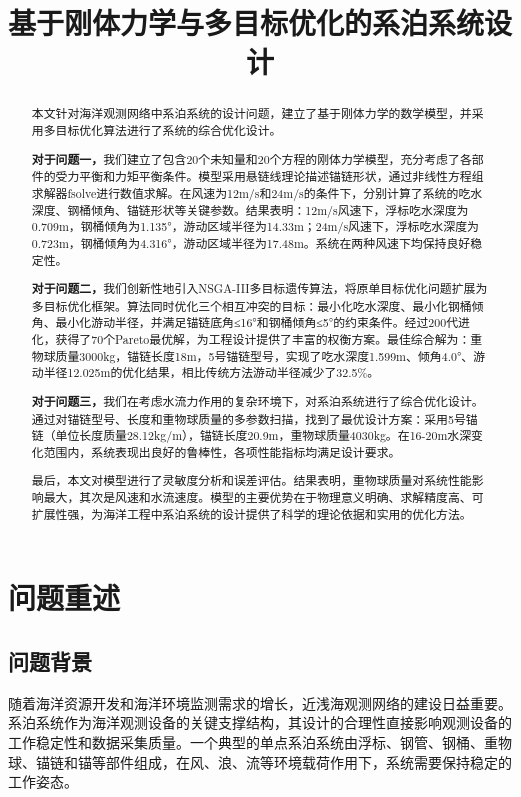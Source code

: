 \documentclass[withoutpreface,bwprint]{cumcmthesis}
\title{基于刚体力学与多目标优化的系泊系统设计}  %
\begin{document}
\maketitle
\begin{abstract}
本文针对海洋观测网络中系泊系统的设计问题，建立了基于刚体力学的数学模型，并采用多目标优化算法进行了系统的综合优化设计。

\textbf{对于问题一，}我们建立了包含20个未知量和20个方程的刚体力学模型，充分考虑了各部件的受力平衡和力矩平衡条件。模型采用悬链线理论描述锚链形状，通过非线性方程组求解器fsolve进行数值求解。在风速为12m/s和24m/s的条件下，分别计算了系统的吃水深度、钢桶倾角、锚链形状等关键参数。结果表明：12m/s风速下，浮标吃水深度为0.709m，钢桶倾角为1.135°，游动区域半径为14.33m；24m/s风速下，浮标吃水深度为0.723m，钢桶倾角为4.316°，游动区域半径为17.48m。系统在两种风速下均保持良好稳定性。

\textbf{对于问题二，}我们创新性地引入NSGA-III多目标遗传算法，将原单目标优化问题扩展为多目标优化框架。算法同时优化三个相互冲突的目标：最小化吃水深度、最小化钢桶倾角、最小化游动半径，并满足锚链底角≤16°和钢桶倾角≤5°的约束条件。经过200代进化，获得了70个Pareto最优解，为工程设计提供了丰富的权衡方案。最佳综合解为：重物球质量3000kg，锚链长度18m，5号锚链型号，实现了吃水深度1.599m、倾角4.0°、游动半径12.025m的优化结果，相比传统方法游动半径减少了32.5\%。

\textbf{对于问题三，}我们在考虑水流力作用的复杂环境下，对系泊系统进行了综合优化设计。通过对锚链型号、长度和重物球质量的多参数扫描，找到了最优设计方案：采用5号锚链（单位长度质量28.12kg/m），锚链长度20.9m，重物球质量4030kg。在16-20m水深变化范围内，系统表现出良好的鲁棒性，各项性能指标均满足设计要求。

最后，本文对模型进行了灵敏度分析和误差评估。结果表明，重物球质量对系统性能影响最大，其次是风速和水流速度。模型的主要优势在于物理意义明确、求解精度高、可扩展性强，为海洋工程中系泊系统的设计提供了科学的理论依据和实用的优化方法。

\end{abstract}


\section{问题重述}
\subsection{问题背景}
随着海洋资源开发和海洋环境监测需求的增长，近浅海观测网络的建设日益重要。系泊系统作为海洋观测设备的关键支撑结构，其设计的合理性直接影响观测设备的工作稳定性和数据采集质量。一个典型的单点系泊系统由浮标、钢管、钢桶、重物球、锚链和锚等部件组成，在风、浪、流等环境载荷作用下，系统需要保持稳定的工作姿态。
\end{document}
